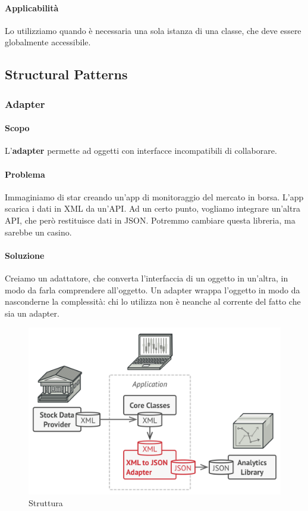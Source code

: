 \documentclass[11pt]{article}
\begin{document}
\paragraph{Applicabilità}
Lo utilizziamo quando è necessaria una sola istanza di una classe, che deve essere globalmente accessibile. 

\subsection{Structural Patterns}
\subsubsection{Adapter}
\paragraph{Scopo}
L'\textbf{adapter} permette ad oggetti con interfacce incompatibili di collaborare.

\paragraph{Problema}
Immaginiamo di star creando un'app di monitoraggio del mercato in borsa. L'app scarica i dati in XML da un'API. Ad un certo punto, vogliamo integrare un'altra API, che però restituisce dati in JSON. Potremmo cambiare questa libreria, ma sarebbe un casino. 
\paragraph{Soluzione}
Creiamo un adattatore, che converta l'interfaccia di un oggetto in un'altra, in modo da farla comprendere all'oggetto. Un adapter wrappa l'oggetto in modo da nasconderne la complessità: chi lo utilizza non è neanche al corrente del fatto che sia un adapter. 
\begin{figure}[H]
    \centering
    \includegraphics[width=\linewidth]{res/teoria/Adapter.png}
    \caption{Struttura}
\end{figure}
\end{document}
